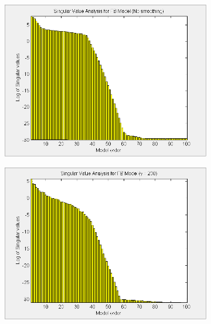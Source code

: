\begin{landscape}
\begin{figure}[H]
\centering
\begin{subfigure}[b]{0.4\textwidth}
\includegraphics[width=1.0\textwidth]{pics/SVD_FB_inf}
\caption{}
\label{pic:}
\end{subfigure}\;\begin{subfigure}[b]{0.4\textwidth}
\includegraphics[width=1.0\textwidth]{pics/SVD_FB_200}
\caption{}
\label{pic:}
\end{subfigure}\;\begin{subfigure}[b]{0.4\textwidth}

\end{subfigure}
\end{figure}
\end{landscape}
